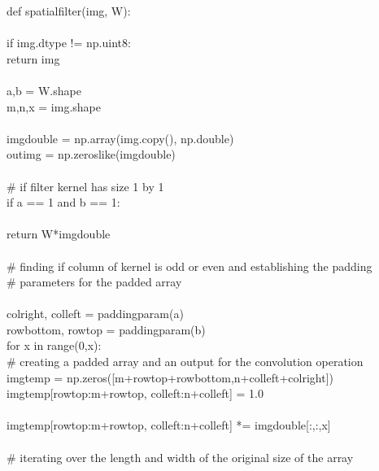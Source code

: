 \documentclass{article}
\begin{document}
	\noindent def spatial\textunderscore filter(img, W): \\
	\\ 
	\indent if img.dtype != np.uint8:\\
	\indent \indent return img\\
	\\
	\indent a,b = W.shape\\
	\indent m,n,x = img.shape\\
	\\
	\indent img\textunderscore double = np.array(img.copy(), np.double)\\
	\indent out\textunderscore img = np.zeros\textunderscore like(img\textunderscore double)\\
	\\
	\indent \# if filter kernel has size 1 by 1\\
	\indent if a == 1 and b == 1:\\
	\\
	\indent \indent return W*img\textunderscore double\\
	\\
	\indent \# finding if column of kernel is odd or even and establishing the padding \\
	\indent \# parameters for the padded array\\
	\\
	\indent col\textunderscore right, col\textunderscore left = padding\textunderscore param(a)\\
	\indent row\textunderscore bottom, row\textunderscore top = padding\textunderscore param(b)\\
	\indent for x in range(0,x):\\
	\indent \indent \# creating a padded array and an output for the convolution operation \\
	\indent \indent img\textunderscore temp = np.zeros([m+row\textunderscore top+row\textunderscore bottom,n+col\textunderscore left+col\textunderscore right])\\
	\indent \indent img\textunderscore temp[row\textunderscore top:m+row\textunderscore top, col\textunderscore left:n+col\textunderscore left] = 1.0\\
	\\
	\indent \indent img\textunderscore temp[row\textunderscore top:m+row\textunderscore top, col\textunderscore left:n+col\textunderscore left] *= img\textunderscore double[:,:,x]\\
	\\
	\indent \indent \# iterating over the length and width of the original size of the array\\
\end{document}
